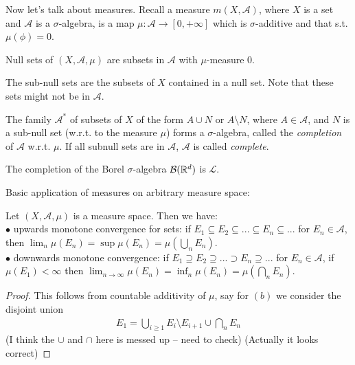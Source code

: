 \documentclass[a4paper]{article}
\begin{document}
Now let's talk about measures. Recall a measure $m(X,\mathcal{A})$, where $X$ is a set and $\mathcal{A}$ is a $\sigma$-algebra, is a map $\mu: \mathcal{A} \to [0,+\infty]$ which is $\sigma$-additive and that s.t. $\mu(\phi)=0$.

Null sets of $(X,\mathcal{A},\mu)$ are subsets in $\mathcal{A}$ with $\mu$-measure $0$.

The sub-null sets are the subsets of $X$ contained in a null set. Note that these sets might not be in $\mathcal{A}$.

\begin{defi}
The family $\mathcal{A}^*$ of subsets of $X$ of the form $A \cup N$ or $A \setminus N$, where $A \in \mathcal{A}$, and $N$ is a sub-null set (w.r.t. to the measure $\mu$) forms a $\sigma$-algebra, called the \emph{completion} of $\mathcal{A}$ w.r.t. $\mu$. If all subnull sets are in $\mathcal{A}$, $\mathcal{A}$ is called \emph{complete}.
\end{defi}

\begin{eg}
The completion of the Borel $\sigma$-algebra $\mathcal{B}(\mathbb{R}^d)$ is $\mathcal{L}$.
\end{eg}

Basic application of measures on arbitrary measure space:
\begin{prop}
Let $(X,\mathcal{A},\mu)$ is a measure space. Then we have:\\
$\bullet$ upwards monotone convergence for sets: if $E_1 \subseteq E_2 \subseteq ... \subseteq E_n \subseteq ...$ for $ E_n \in \mathcal{A}$, then $\lim_n \mu(E_n) = \sup \mu(E_n) = \mu(\bigcup_n E_n)$.\\
$\bullet$ downwards monotone convergence: if $E_1 \supseteq E_2 \supseteq ... \supset E_n \supseteq ...$ for $E_n \in \mathcal{A}$, if $\mu(E_1) < \infty$ then $\lim_{n \to \infty} \mu(E_n) =\inf_n \mu(E_n) = \mu(\bigcap_n E_n)$.
\begin{proof}
This follows from countable additivity of $\mu$, say for $(b)$ we consider the disjoint union
\begin{equation*}
\begin{aligned}
E_1 = \bigcup_{i \geq 1} E_i \setminus E_{i+1} \cup \bigcap_n E_n
\end{aligned}
\end{equation*}
(I think the $\cup$ and $\cap$ here is messed up -- need to check) (Actually it looks correct)
\end{proof}
\end{prop}
\end{document}
